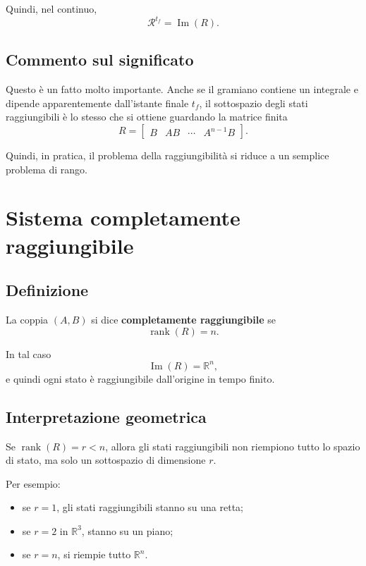 Quindi, nel continuo,
\begin{equation}
\mathcal{R}^{t_f}=\operatorname{Im}(R).
\label{eq:L11_Rtf_uguale_R}
\end{equation}

\subsection{Commento sul significato}

Questo è un fatto molto importante.  
Anche se il gramiano contiene un integrale e dipende apparentemente dall’istante finale \(t_f\), il sottospazio degli stati raggiungibili è lo stesso che si ottiene guardando la matrice finita
\[
R=
\begin{bmatrix}
B & AB & \cdots & A^{n-1}B
\end{bmatrix}.
\]

Quindi, in pratica, il problema della raggiungibilità si riduce a un semplice problema di rango.

\section{Sistema completamente raggiungibile}

\subsection*{Definizione}
La coppia \((A,B)\) si dice \textbf{completamente raggiungibile} se
\begin{equation}
\operatorname{rank}(R)=n.
\label{eq:L11_rank_full}
\end{equation}

In tal caso
\[
\operatorname{Im}(R)=\mathbb{R}^n,
\]
e quindi ogni stato è raggiungibile dall’origine in tempo finito.

\subsection{Interpretazione geometrica}

Se \(\operatorname{rank}(R)=r<n\), allora gli stati raggiungibili non riempiono tutto lo spazio di stato, ma solo un sottospazio di dimensione \(r\).

Per esempio:
\begin{itemize}
    \item se \(r=1\), gli stati raggiungibili stanno su una retta;
    \item se \(r=2\) in \(\mathbb{R}^3\), stanno su un piano;
    \item se \(r=n\), si riempie tutto \(\mathbb{R}^n\).
\end{itemize}

